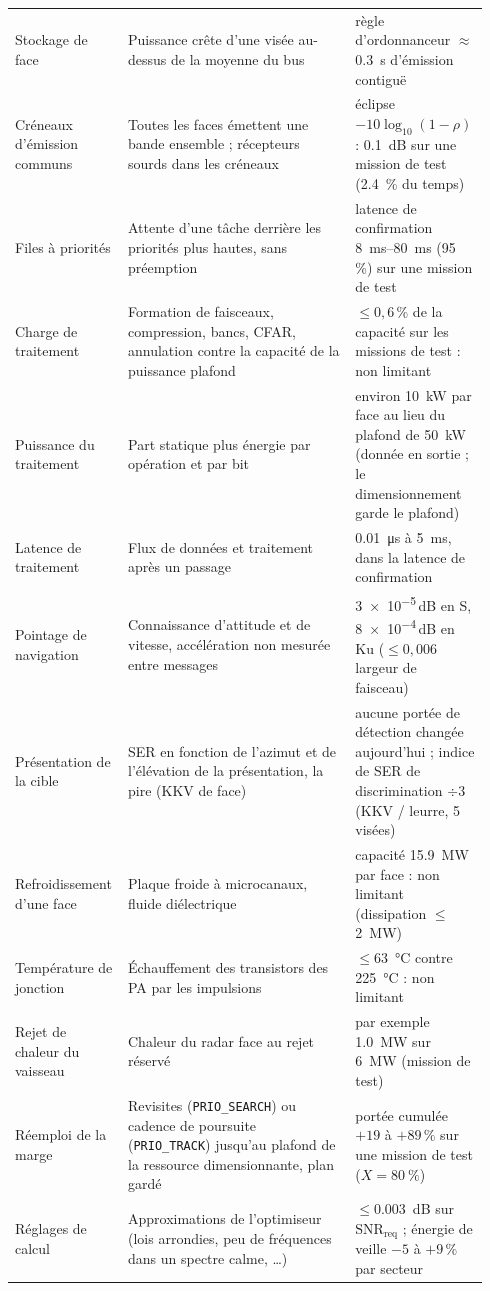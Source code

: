 \documentclass[11pt,a4paper]{article}
\newcommand{\code}[1]{\texttt{\small #1}}
\newcommand{\SNR}{\mathrm{SNR}}
\begin{document}
{\begin{longtable}{@{}p{0.22\linewidth}p{0.47\linewidth}p{0.25\linewidth}@{}}
Stockage de face & Puissance crête d'une visée au-dessus de la moyenne du bus & règle d'ordonnanceur
$\approx$\SI{0.3}{s} d'émission contiguë\\
Créneaux d'émission communs & Toutes les faces émettent une bande ensemble ; récepteurs sourds dans les créneaux &
éclipse $-10\log_{10}(1-\rho)$ : \SI{0.1}{dB} sur une mission de test (\SI{2.4}{\percent} du temps)\\
Files à priorités & Attente d'une tâche derrière les priorités plus hautes, sans préemption & latence de confirmation
\SIrange{8}{80}{ms} (95\,\%) sur une mission de test\\
Charge de traitement & Formation de faisceaux, compression, bancs, CFAR, annulation contre la capacité de la puissance
plafond & $\le 0,6\,\%$ de la capacité sur les missions de test : non limitant\\
Puissance du traitement & Part statique plus énergie par opération et par bit & environ \SI{10}{kW} par face au lieu du
plafond de \SI{50}{kW} (donnée en sortie ; le dimensionnement garde le plafond)\\
Latence de traitement & Flux de données et traitement après un passage & \SI{0.01}{\micro s} à \SI{5}{ms}, dans la
latence de confirmation\\
Pointage de navigation & Connaissance d'attitude et de vitesse, accélération non mesurée entre messages &
\num{3e-5}\,dB en S, \num{8e-4}\,dB en Ku ($\le 0,006$ largeur de faisceau)\\
Présentation de la cible & SER en fonction de l'azimut et de l'élévation de la présentation, la pire (KKV de face) &
aucune portée de détection changée aujourd'hui ; indice de SER de discrimination $\div 3$ (KKV / leurre, 5 visées)\\
Refroidissement d'une face & Plaque froide à microcanaux, fluide diélectrique & capacité \SI{15.9}{MW} par face : non
limitant (dissipation $\le$ \SI{2}{MW})\\
Température de jonction & Échauffement des transistors des PA par les impulsions & $\le$\SI{63}{\celsius} contre
\SI{225}{\celsius} : non limitant\\
Rejet de chaleur du vaisseau & Chaleur du radar face au rejet réservé & par exemple \SI{1.0}{MW} sur \SI{6}{MW}
(mission de test)\\
Réemploi de la marge & Revisites (\code{PRIO\_SEARCH}) ou cadence de poursuite (\code{PRIO\_TRACK}) jusqu'au plafond de la ressource dimensionnante, plan gardé
& portée cumulée $+19$ à $+89\,\%$ sur une mission de test ($X = \SI{80}{\percent}$)\\
Réglages de calcul & Approximations de l'optimiseur (lois arrondies, peu de fréquences dans un spectre calme, \dots) &
$\le$\SI{0.003}{dB} sur $\SNR_{\mathrm{req}}$ ; énergie de veille $-5$ à $+9\,\%$ par secteur\\
\bottomrule
\end{longtable}}
\end{document}
